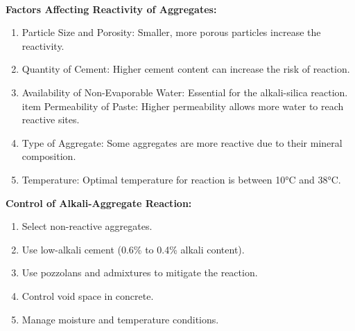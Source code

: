 \documentclass[a4paper,11pt]{book}
\begin{document}
\textbf{\\Factors Affecting Reactivity of Aggregates:}
\begin{enumerate}
	\item Particle Size and Porosity: Smaller, more porous particles increase the reactivity.
	\item	Quantity of Cement: Higher cement content can increase the risk of reaction.
	\item Availability of Non-Evaporable Water: Essential for the alkali-silica reaction.
	\\item Permeability of Paste: Higher permeability allows more water to reach reactive sites.
	\item	Type of Aggregate: Some aggregates are more reactive due to their mineral composition.
	\item	Temperature: Optimal temperature for reaction is between 10°C and 38°C.
\end{enumerate}
\textbf{Control of Alkali-Aggregate Reaction:}
\begin{enumerate}
	\item Select non-reactive aggregates.
	\item Use low-alkali cement (0.6\% to 0.4\% alkali content).
	\item Use pozzolans and admixtures to mitigate the reaction.
	\item Control void space in concrete.
	\item Manage moisture and temperature conditions.
\end{enumerate}
\end{document}
